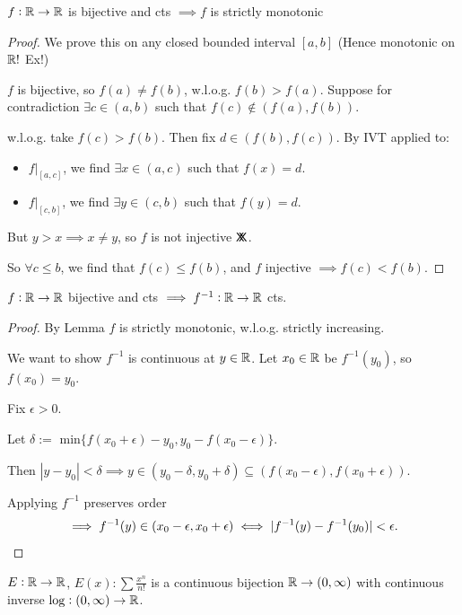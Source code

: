 \documentclass[twoside]{scrartcl}
\newcommand*{\cont}{%
  \mathsf{X}\mkern-8.5mu\mathsf{X}%
}
\begin{document}
\begin{lemma}
$f:\mathbb{R} \to \mathbb{R}$ is bijective and cts $\implies f$ is strictly monotonic	
\end{lemma}

\begin{proof}
We prove this on any closed bounded interval $[a,b]$ (Hence monotonic on $\mathbb{R}!$ Ex!)

$f$ is bijective, so $f(a) \neq f(b)$, w.l.o.g. $f(b) > f(a).$ Suppose for contradiction $\exists c \in (a,b)$ such that $f(c) \not\in (f(a),f(b)).$ 

w.l.o.g. take $f(c) > f(b)$. Then fix $d \in (f(b),f(c))$. By IVT applied to:
\begin{itemize} 
\item $f|_{[a,c]}$, we find $\exists x \in (a,c)$ such that $f(x) = d$. 
\item $f|_{[c,b]}$, we find $\exists y \in (c,b)$ such that $f(y) = d$.
	
\end{itemize}
But $y > x \implies x  \neq y$, so $f$ is not injective $\cont$. 

So $\forall c \leq b$, we find that $f(c) \leq f(b)$, and $f$ injective $\implies f(c) < f(b)$. 
\end{proof}\vspace*{5pt}

\begin{theorem}
	$f: \mathbb{R} \to \mathbb{R}$ bijective and cts $\implies f^{-1}: \mathbb{R} \to \mathbb{R}$ cts.
\end{theorem}
\begin{proof}
By Lemma $f$ is strictly monotonic, w.l.o.g. strictly increasing. 

We want to show $f^{-1}$ is continuous at $y\in\mathbb{R}$. Let $x_0 \in\mathbb{R}$ be $f^{-1}(y_0)$, so $f(x_0) = y_0$.

Fix $\epsilon > 0$.

Let $\delta :=$ min$\{f(x_0 + \epsilon) - y_0, y_0 - f(x_0 - \epsilon)\}$. 
 
 Then $|y -  y_0| < \delta \implies y \in (y_0 -\delta, y_0 + \delta) \subseteq (f(x_0 - \epsilon), f(x_0 + \epsilon))$. 
 
 Applying $f^{-1}$ preserves order \[\implies f^{-1}(y) \in (x_0 - \epsilon, x_0 + \epsilon) \iff |f^{-1}(y) - f^{-1}(y_0)| < \epsilon.\qedhere\]
\end{proof}\vspace*{5pt}

\begin{corollary}
$E:\mathbb{R} \to \mathbb{R}$, $E(x): \sum \frac{x^n}{n!}$ is a continuous bijection $\mathbb{R} \to (0,\infty)$ with continuous inverse $\log: (0,\infty) \to \mathbb{R}$. 	
\end{corollary}\vspace*{5pt}
\end{document}
